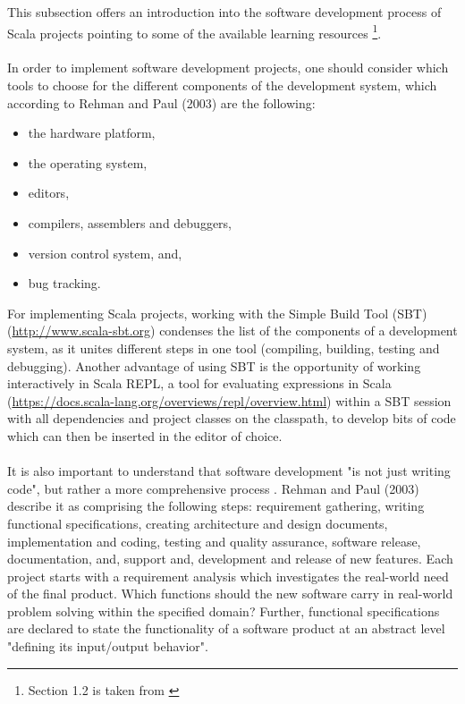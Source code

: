 \documentclass {article}
\begin{document}
This subsection offers an introduction into the software development process of Scala projects pointing to some of the available learning resources \footnote {Section 1.2 is taken from \cite{tesileanu_using_2017}}.
\\
\\
In order to implement software development projects, one should consider which tools to choose for the different components of the development system, which according to Rehman and Paul (2003) \cite{rehman_linux_2003}are the following:
\begin{itemize}
\item  the hardware platform,
\item  the operating system,
\item  editors,
\item compilers, assemblers and debuggers,
\item  version control system, and,
\item  bug tracking.
\end{itemize} 
For implementing Scala projects, working with the Simple Build Tool (SBT) (\href{http://www.scala-sbt.org}{http://www.scala-sbt.org}) condenses the list of the components of a development system, as it unites different steps in one tool (compiling, building, testing and debugging). Another advantage of using SBT is the opportunity of working interactively in Scala REPL, a tool for evaluating expressions in Scala (\href{https://docs.scala-lang.org/overviews/repl/overview.html}{https://docs.scala-lang.org/overviews/repl/overview.html}) within a SBT session with all dependencies and project classes on the classpath, to develop bits of code which can then be inserted in the editor of choice.
\\
\\  
It is also important to understand that software development "is not just writing code", but rather a more comprehensive process \cite{rehman_linux_2003}. 
Rehman and Paul (2003) describe it as comprising the following steps: requirement gathering, writing functional specifications, creating architecture and design documents, implementation and coding, testing and quality assurance, software release, documentation, and, support and, development and release of new features. 
Each project starts with a requirement analysis which investigates the real-world need of the final product. Which functions should the new software carry in real-world problem solving within the specified domain?
 Further, functional specifications are declared to state the functionality of a software product at an abstract level "defining its input/output behavior". 
\end{document}
